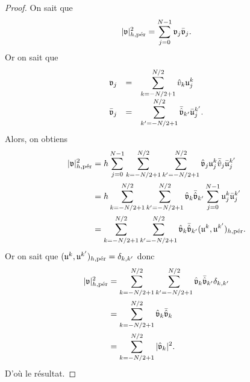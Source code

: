 \begin{proof}
On sait que 
\begin{equation}
|\mathfrak{v}|_{h,\per}^2 = \gsum_{j=0}^{N-1} \mathfrak{v}_j \bar{\mathfrak{v}}_j.
\end{equation}
Or on sait que
\begin{equation}
\begin{array}{rcl}
\mathfrak{v}_j & = & \gsum_{k = -N/2+1}^{N/2} \hat{v}_k \mathfrak{u}_j^k \\
\bar{\mathfrak{v}}_j & = & \gsum_{k' = -N/2+1}^{N/2} \bar{\hat{\mathfrak{v}}}_{k'} \bar{\mathfrak{u}}_j^{k'}.
\end{array}
\end{equation}
Alors, on obtiens
\begin{align*}
|\mathfrak{v}|_{h,\per}^2 & = h \gsum_{j=0}^{N-1} \gsum_{k=-N/2+1}^{N/2} \gsum_{k'=-N/2+1}^{N/2} \hat{\mathfrak{v}}_j \mathfrak{u}_j^k \bar{\hat{v}}_j \bar{\mathfrak{u}}_j^{k'} \\
	& = h \gsum_{k=-N/2+1}^{N/2} \gsum_{k'=-N/2+1}^{N/2} \hat{\mathfrak{v}}_k \bar{\hat{\mathfrak{v}}}_{k'} \gsum_{j=0}^{N-1} \mathfrak{u}_j^k \bar{\mathfrak{u}}_j^{k'} \\
	& = \gsum_{k=-N/2+1}^{N/2} \gsum_{k'=-N/2+1}^{N/2} \hat{\mathfrak{v}}_k \bar{\hat{\mathfrak{v}}}_{k'} (\mathfrak{u}^k, \mathfrak{u}^{k'})_{h,\per}.
\end{align*}
Or on sait que $(\mathfrak{u}^k, \mathfrak{u}^{k'})_{h,\per} = \delta_{k,k'}$ donc
\begin{align*}
|\mathfrak{v}|_{h,\per}^2 & = \gsum_{k=-N/2+1}^{N/2} \gsum_{k'=-N/2+1}^{N/2} \hat{\mathfrak{v}}_k \bar{\hat{\mathfrak{v}}}_{k'} \delta_{k,k'}\\
	& = \gsum_{k=-N/2+1}^{N/2} \hat{\mathfrak{v}}_k \bar{\hat{\mathfrak{v}}}_k \\
	& = \gsum_{k=-N/2+1}^{N/2} |\hat{\mathfrak{v}}_k|^2.
\end{align*}
D'où le résultat.
\end{proof}

















